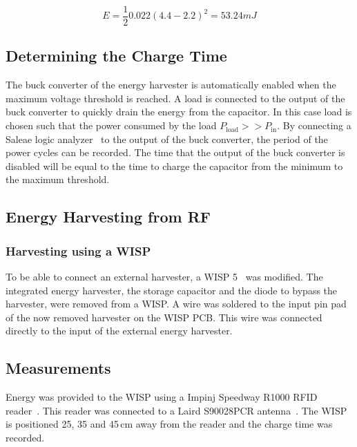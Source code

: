 \begin{equation}
\label{eq:cap2}
E = \frac{1}{2} 0.022 (4.4 - 2.2)^2 = 53.24 mJ
\end{equation}


\subsection{Determining the Charge Time}

The buck converter of the energy harvester is automatically enabled when the maximum voltage threshold is reached.
A load is connected to the output of the buck converter to quickly drain the energy from the capacitor.
In this case load is chosen such that the power consumed by the load $P_{\text{load}} >> P_{\text{in}}$.
By connecting a Saleae logic analyzer~\cite{saleae_2017} to the output of the buck converter, the period of the power cycles can be recorded.
The time that the output of the buck converter is disabled will be equal to the time to charge the capacitor from the minimum to the maximum threshold.

\subsection{Energy Harvesting from RF}

\subsubsection{Harvesting using a WISP}
To be able to connect an external harvester, a WISP 5~\cite{sample_transim_2008} was modified.
The integrated energy harvester, the storage capacitor and the diode to bypass the harvester, were removed from a WISP.
A wire was soldered to the input pin pad of the now removed harvester on the WISP PCB.
This wire was connected directly to the input of the external energy harvester.

\subsection{Measurements}
Energy was provided to the WISP using a Impinj Speedway R1000 RFID reader~\cite{impinj_eol_2017, indy_r1000_2017}.
This reader was connected to a Laird S90028PCR antenna~\cite{laird_s9028pcr_2017}.
The WISP is positioned 25, 35 and 45\,cm away from the reader and the charge time was recorded.

